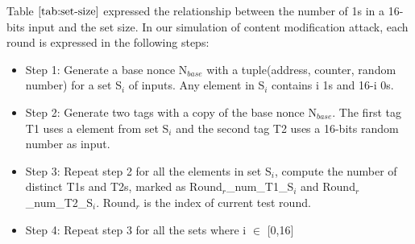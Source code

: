 \documentclass{article}
\begin{document}
Table $\ref{tab:set-size}$ expressed the relationship between the number of 1s in a 16-bits input and the set size. In our simulation of content modification attack, each round is expressed in the following steps:
\begin{itemize}
	\item Step 1: Generate a base nonce N$_{base}$ with a tuple(address, counter, random number) for a set S$_i$ of inputs. Any element in S$_i$ contains i 1s and 16-i 0s.
	\item Step 2: Generate two tags with a copy of the base nonce N$_{base}$. The first tag T1 uses a element from set S$_i$  and the second tag T2 uses a 16-bits random number as input. 
	\item Step 3: Repeat step 2 for all the elements in set S$_i$, compute the number of distinct T1s and T2s, marked as Round$_r$\_num\_T1\_S$_i$ and Round$_r$\_num\_T2\_S$_i$. Round$_r$ is the index of current test round.
	\item Step 4: Repeat step 3 for all the sets where i $\in$ [0,16] 
\end{itemize}
\end{document}

